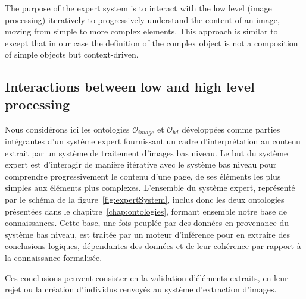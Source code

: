 The purpose of the expert system is to interact with the low level (image processing) iteratively to progressively understand the content of an image, moving from simple to more complex elements.
This approach is similar to~\cite{Sciascio2011Structured} except that in our case the definition of the complex object is not a composition of simple objects but context-driven.


\subsection{Interactions between low and high level processing} %
\label{sub:interactions_between_low_and_high_level_processing}


Nous considérons ici les ontologies $\mathcal{O}_{image}$ et $\mathcal{O}_{bd}$ développées comme parties intégrantes d'un système expert fournissant un cadre d'interprétation au contenu extrait par un système de traitement d'images bas niveau.
Le but du système expert est d'interagir de manière itérative avec le système bas niveau pour comprendre progressivement le contenu d'une page, de ses éléments les plus simples aux éléments plus complexes.
L'ensemble du système expert, représenté par le schéma de la figure~\ref{fig:expertSystem}, inclus donc les deux ontologies présentées dans le chapitre~\ref{chap:ontologies}, formant ensemble notre base de connaissances.
Cette base, une fois peuplée par des données en provenance du système bas niveau, est traitée par un moteur d'inférence pour en extraire des conclusions logiques, dépendantes des données et de leur cohérence par rapport à la connaissance formalisée.

Ces conclusions peuvent consister en la validation d'éléments extraits, en leur rejet ou la création d'individus renvoyés au système d'extraction d'images.\\

